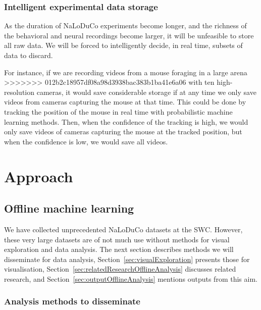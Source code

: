 \documentclass[12pt]{article}
\begin{document}
\subsubsection*{Intelligent experimental data storage}

As the duration of NaLoDuCo experiments become longer, and the richness of the                                                              
behavioral and neural recordings become larger, it will be unfeasible to                                                                
store all raw data. We will be forced to intelligently decide, in real time,                                                                
subsets of data to discard.
                                                                                                                                            
For instance, if we are recording videos from a mouse foraging in a large arena
>>>>>>> 012b2c18957df08a98d3938bac383b1ba41e6a06
with ten high-resolution cameras, it would save considerable storage if at any
time we only save videos from cameras capturing the mouse at that time.  This
could be done by tracking the position of the mouse in real time with
probabilistic machine learning methods. Then, when the confidence of the
tracking is high, we would only save videos of cameras capturing the mouse at
the tracked position, but when the confidence is low, we would save all videos.

\section{Approach}

\subsection{Offline machine learning}

We have collected unprecedented NaLoDuCo datasets at the SWC. However, these
very large datasets are of not much use without methods for visual exploration
and data analysis. The next section describes methods we will disseminate for
data analysis, Section~\ref{sec:visualExploration} presents those for
visualisation, Section~\ref{sec:relatedResearchOfflineAnalysis} discusses
related research, and Section~\ref{sec:outputOfflineAnalysis} mentions outputs
from this aim.

\subsubsection{Analysis methods to disseminate}
\end{document}
